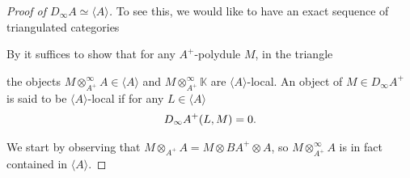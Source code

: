 \documentclass[../thesis.tex]{subfiles}
\begin{document}
            \begin{proof}[Proof of $D_\infty A \simeq \langle A \rangle$]
                To see this, we would like to have an exact sequence of triangulated categories
                \begin{center}
                \end{center}
                By \cite[Proposition 3.2.8][81]{Krause21} it suffices to show that for any $A^+$-polydule $M$, in the triangle
                \begin{center}
                \end{center}
                the objects $M \otimes_{A^+}^\infty A \in \langle A \rangle$ and $M \otimes_{A^+}^\infty \mathbb{K}$ are $\langle A \rangle$-local. An object of $M \in D_\infty A^+$ is said to be $\langle A \rangle$-local if for any $L \in \langle A \rangle$
                \begin{align*}
                    D_\infty A^+(L, M) = 0 \tt{.}
                \end{align*}

                We start by observing that $M \otimes_{A^+} A = M \otimes BA^+ \otimes A$, so $M \otimes_{A^+}^\infty A$ is in fact contained in $\langle A \rangle$.


\end{proof}
\end{document}
